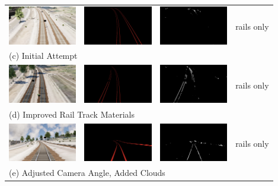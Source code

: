 \begin{table}
\begin{tabular}{cccc}
  \includegraphics[width=30mm]{src/img/results-ml-0/par0/frame.jpg} & 
  \includegraphics[width=30mm]{src/img/results-ml-0/par0/seg.jpg} & 
  \includegraphics[width=30mm]{src/img/results-ml-0/par0/det.jpg} &
  rails only  \\
  \multicolumn{4}{l}{ (c) Initial Attempt } \\ \hline
  
  \includegraphics[width=30mm]{src/img/results-ml-0/par1/frame.jpg} & 
  \includegraphics[width=30mm]{src/img/results-ml-0/par1/seg.jpg} & 
  \includegraphics[width=30mm]{src/img/results-ml-0/par1/det.jpg} &
  rails only  \\
  \multicolumn{4}{l}{   (d) Improved Rail Track Materials } \\ \hline
  
  \includegraphics[width=30mm]{src/img/results-ml-0/par2/frame.jpg} & 
  \includegraphics[width=30mm]{src/img/results-ml-0/par2/seg.jpg} & 
  \includegraphics[width=30mm]{src/img/results-ml-0/par2/det.jpg} &
  rails only  \\
  \multicolumn{4}{l}{  (e) Adjusted Camera Angle, Added Clouds  } \\ \hline
  

\end{tabular}
\end{table}
